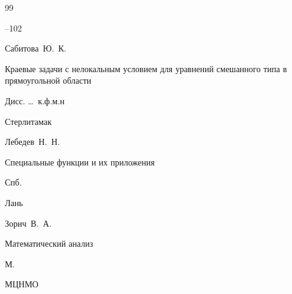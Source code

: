 \begin{thebibliography}{99}

--102





\by Сабитова~Ю.~К.

\thesis Краевые задачи с нелокальным условием для уравнений смешанного типа в прямоугольной области 

\thesisinfo Дисс. \dots\ к.ф.м.н

\publaddr Стерлитамак










\by Лебедев~Н.~Н.

\book Специальные функции и их приложения

\publaddr Спб.

\publ Лань












\by Зорич~В.~А.

\book Математический анализ


\publaddr М.

\publ МЦНМО


\end{thebibliography}

